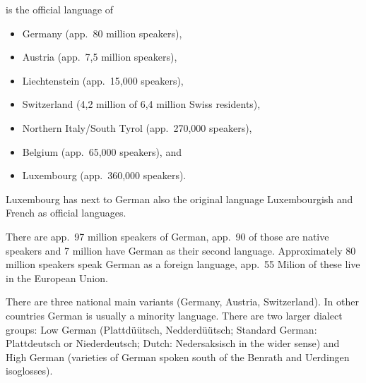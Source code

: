  is the official language of
\begin{itemize}
\item Germany (app.\ 80 million speakers), 
\item Austria (app.\ 7,5 million speakers), 
\item Liechtenstein (app.\ 15,000 speakers), 
\item Switzerland (4,2 million of 6,4 million Swiss residents),
\item Northern Italy/South Tyrol (app.\ 270,000 speakers), 
\item Belgium (app.\ 65,000 speakers), and
\item Luxembourg (app.\ 360,000 speakers).
\end{itemize}
Luxembourg has next to German also the original language Luxembourgish and French as official
languages.

There are app.\ 97 million speakers of German, app.\, 90 of those are native speakers and 7 million
have German as their second language.
Approximately 80 million speakers speak German as a foreign language, app.\ 55 Milion of these live
in the European Union.

There are three national main variants (Germany, Austria, Switzerland). In other countries German is
usually a minority language. There are two larger dialect groups: Low German (Plattdüütsch,
Nedderdüütsch; Standard German: Plattdeutsch or Niederdeutsch; Dutch: Nedersaksisch in the wider
sense) and High German (varieties of German spoken south of the Benrath and Uerdingen isoglosses).





